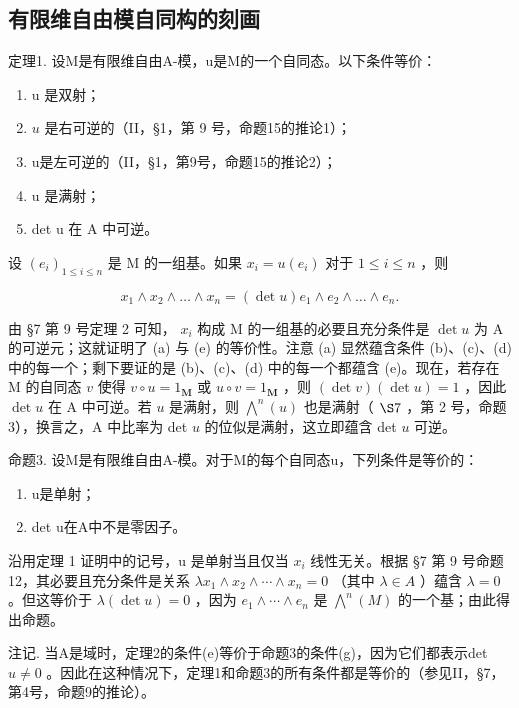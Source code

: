 \subsection{有限维自由模自同构的刻画}

定理1. 设M是有限维自由A-模，u是M的一个自同态。以下条件等价：

\begin{enumerate}
\def\labelenumi{(\alph{enumi})}
\item
  u 是双射；
\item
  \(u\) 是右可逆的（II，§1，第 9 号，命题15的推论1）；
\item
  u是左可逆的（II，§1，第9号，命题15的推论2）；
\item
  u 是满射；
\item
  det u 在 A 中可逆。
\end{enumerate}

设 \((e_i)_{1\leqslant i\leqslant n}\) 是 M 的一组基。如果 \(x_{i} = u(e_{i})\) 对于 \(1\leqslant i\leqslant n\) ，则

\[
x _ {1} \wedge x _ {2} \wedge \dots \wedge x _ {n} = (\det u) e _ {1} \wedge e _ {2} \wedge \dots \wedge e _ {n}.
\]

由 §7 第 9 号定理 2 可知， \(x_{i}\) 构成 M 的一组基的必要且充分条件是 \(\det u\) 为 A 的可逆元；这就证明了 (a) 与 (e) 的等价性。注意 (a) 显然蕴含条件 (b)、(c)、(d) 中的每一个；剩下要证的是 (b)、(c)、(d) 中的每一个都蕴含 (e)。现在，若存在 M 的自同态 \(v\) 使得 \(v \circ u = 1_{\mathbf{M}}\) 或 \(u \circ v = 1_{\mathbf{M}}\) ，则 \((\det v)(\det u) = 1\) ，因此 \(\det u\) 在 A 中可逆。若 \(u\) 是满射，则 \(\bigwedge^{n}(u)\) 也是满射（ \(\S 7\) ，第 2 号，命题 3），换言之，A 中比率为 det \(u\) 的位似是满射，这立即蕴含 det \(u\) 可逆。

命题3. 设M是有限维自由A-模。对于M的每个自同态u，下列条件是等价的：

\begin{enumerate}
\def\labelenumi{(\alph{enumi})}
\setcounter{enumi}{5}
\item
  u是单射；
\item
  det u在A中不是零因子。
\end{enumerate}

沿用定理 1 证明中的记号，u 是单射当且仅当 \(x_{i}\) 线性无关。根据 §7 第 9 号命题 12，其必要且充分条件是关系 \(\lambda x_{1} \wedge x_{2} \wedge \cdots \wedge x_{n} = 0\) （其中 \(\lambda \in A\) ）蕴含 \(\lambda = 0\) 。但这等价于 \(\lambda(\det u) = 0\) ，因为 \(e_{1} \wedge \cdots \wedge e_{n}\) 是 \(\bigwedge^{n}(M)\) 的一个基；由此得出命题。

注记. 当A是域时，定理2的条件(e)等价于命题3的条件(g)，因为它们都表示det \(u \neq 0\) 。因此在这种情况下，定理1和命题3的所有条件都是等价的（参见II，§7，第4号，命题9的推论）。

